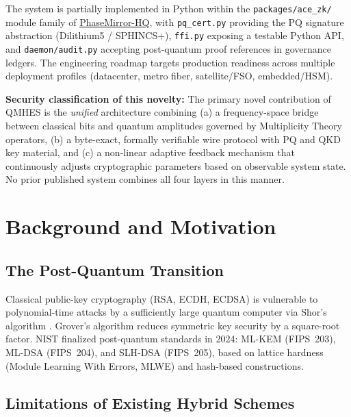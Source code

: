 \documentclass[12pt,letterpaper]{article}
\theoremstyle{plain}
\theoremstyle{definition}
\begin{document}
\noindent
The system is partially implemented in Python within the
\texttt{packages/ace\_zk/} module family of
\href{https://github.com/MultiplicityFoundation/PhaseMirror-HQ}{PhaseMirror-HQ},
with \texttt{pq\_cert.py} providing the PQ signature abstraction (Dilithium5 /
SPHINCS+), \texttt{ffi.py} exposing a testable Python API, and
\texttt{daemon/audit.py} accepting post-quantum proof references in governance
ledgers. The engineering roadmap targets production readiness across multiple
deployment profiles (datacenter, metro fiber, satellite/FSO, embedded/HSM).

\bigskip
\begin{warnbox}
\textbf{Security classification of this novelty:}
The primary novel contribution of QMHES is the \emph{unified} architecture
combining (a) a frequency-space bridge between classical bits and quantum
amplitudes governed by Multiplicity Theory operators, (b) a byte-exact,
formally verifiable wire protocol with PQ and QKD key material, and (c) a
non-linear adaptive feedback mechanism that continuously adjusts cryptographic
parameters based on observable system state. No prior published system combines
all four layers in this manner.
\end{warnbox}

\section{Background and Motivation}

\subsection{The Post-Quantum Transition}

Classical public-key cryptography (RSA, ECDH, ECDSA) is vulnerable to
polynomial-time attacks by a sufficiently large quantum computer via Shor's
algorithm \cite{shor1994}. Grover's algorithm reduces symmetric key security by
a square-root factor. NIST finalized post-quantum standards in 2024:
ML-KEM (FIPS~203), ML-DSA (FIPS~204), and SLH-DSA (FIPS~205), based on
lattice hardness (Module Learning With Errors, MLWE) and hash-based
constructions.

\subsection{Limitations of Existing Hybrid Schemes}
\end{document}
